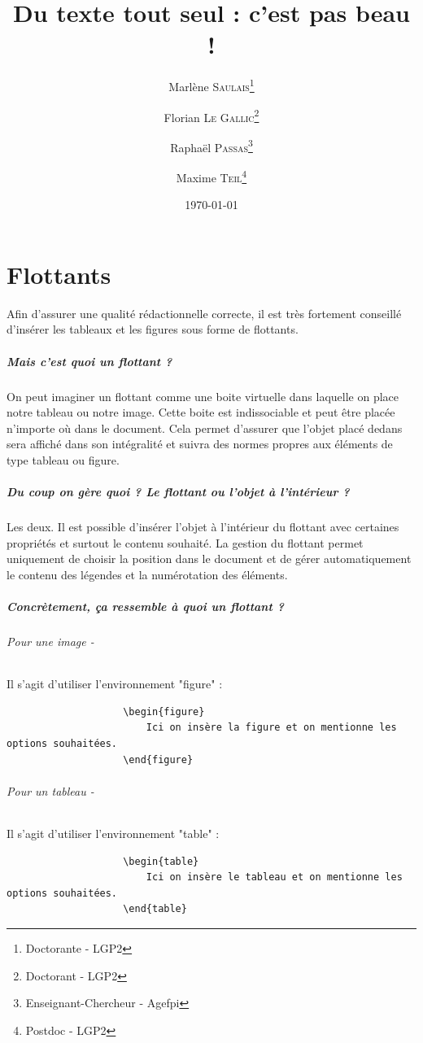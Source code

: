 \documentclass[a4paper, 13pt]{report} %
\title{Du texte tout seul : c'est pas beau !}
\author{Marlène \textsc{Saulais}\thanks{Doctorante - LGP2}
		\and Florian \textsc{Le Gallic}\thanks{Doctorant - LGP2}
		\and Rapha\"el \textsc{Passas}\thanks{Enseignant-Chercheur - Agefpi}
		\and Maxime \textsc{Teil}\thanks{Postdoc - LGP2}}
\date{\today}
\begin{document}
	
	\maketitle
	
	\chapter{Flottants}
		Afin d'assurer une qualité rédactionnelle correcte, il est très fortement conseillé d'insérer les tableaux et les figures sous forme de flottants.
		\paragraph{Mais c'est quoi un flottant ?\\}
			On peut imaginer un flottant comme une boite virtuelle dans laquelle on place notre tableau ou notre image. Cette boite est indissociable et peut être placée n'importe où dans le document. Cela permet d'assurer que l'objet placé dedans sera affiché dans son intégralité et suivra des normes propres aux éléments de type tableau ou figure.
		\paragraph{Du coup on gère quoi ? Le flottant ou l'objet à l'intérieur ?\\}
			Les deux. Il est possible d'insérer l'objet à l'intérieur du flottant avec certaines propriétés et surtout le contenu souhaité. La gestion du flottant permet uniquement de choisir la position dans le document et de gérer automatiquement le contenu des légendes et la numérotation des éléments.
		\paragraph{Concrètement, ça ressemble à quoi un flottant ?}
			\subparagraph{Pour une image -}
				Il s'agit d'utiliser l'environnement "figure" :\\
				\begin{verbatim}
					\begin{figure}
						Ici on insère la figure et on mentionne les options souhaitées.
					\end{figure}
				\end{verbatim}
			\subparagraph{Pour un tableau -}
				Il s'agit d'utiliser l'environnement "table" :\\
				\begin{verbatim}
					\begin{table}
						Ici on insère le tableau et on mentionne les options souhaitées.
					\end{table}
				\end{verbatim}
\end{document}
